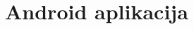 \documentclass[../Document.tex]{subfiles}
\begin{document}
\section{Android aplikacija}
\end{document}
